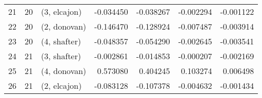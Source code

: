 \begin{tabular}{lllrrrr}
21 &    20 &  (3, elcajon) & -0.034450 & -0.038267 &  -0.002294 & -0.001122 \\
22 &    20 &  (2, donovan) & -0.146470 & -0.128924 &  -0.007487 & -0.003914 \\
23 &    20 &  (4, shafter) & -0.048357 & -0.054290 &  -0.002645 & -0.003541 \\
24 &    21 &  (3, shafter) & -0.002861 & -0.014853 &  -0.000207 & -0.002169 \\
25 &    21 &  (4, donovan) &  0.573080 &  0.404245 &   0.103274 &  0.006498 \\
26 &    21 &  (2, elcajon) & -0.083128 & -0.107378 &  -0.004632 & -0.001434 \\
\bottomrule
\end{tabular}
